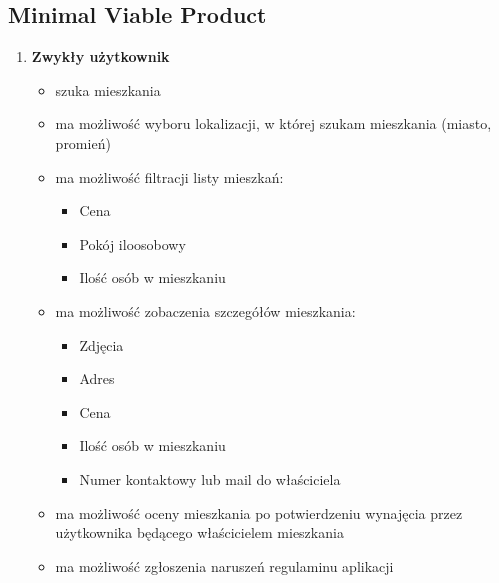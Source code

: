 \documentclass[polish, 11pt]{article}
\begin{document}
    \subsection{Minimal Viable Product}
        \begin{enumerate}
            
            \item \textbf{Zwykły użytkownik}
            \begin{itemize}
                \item szuka mieszkania
                \item ma możliwość wyboru lokalizacji, w której szukam mieszkania (miasto, promień)
                
                \item ma możliwość filtracji listy mieszkań:
                \begin{itemize}
                    \item Cena
                    \item Pokój iloosobowy
                    \item Ilość osób w mieszkaniu
                \end{itemize}
                
                \item ma możliwość zobaczenia szczegółów mieszkania:
                \begin{itemize}
                    \item Zdjęcia
                    \item Adres
                    \item Cena
                    \item Ilość osób w mieszkaniu
                    \item Numer kontaktowy lub mail do właściciela
                \end{itemize}
                
                \item ma możliwość oceny mieszkania po potwierdzeniu wynajęcia przez użytkownika będącego  właścicielem mieszkania
                \item ma możliwość zgłoszenia naruszeń regulaminu aplikacji
            \end{itemize}
            

\end{enumerate}
\end{document}
